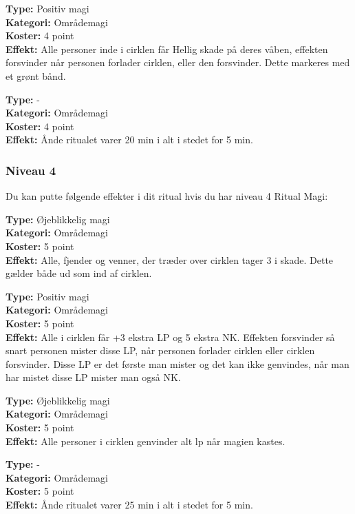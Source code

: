 \begin{ritual*}
\textbf{Type:} Positiv magi\\
\textbf{Kategori:} Områdemagi\\
\textbf{Koster:} 4 point\\
\textbf{Effekt:} Alle personer inde i cirklen får Hellig skade på deres våben, effekten forsvinder når personen forlader cirklen, eller den forsvinder. Dette markeres med et grønt bånd.
\end{ritual*}

\begin{ritual*}
\textbf{Type:} -\\
\textbf{Kategori:} Områdemagi\\
\textbf{Koster:} 4 point\\
\textbf{Effekt:} Ånde ritualet varer 20 min i alt i stedet for 5 min.
\end{ritual*}

\subsubsection*{Niveau 4}
Du kan putte følgende effekter i dit ritual hvis du har niveau 4 Ritual Magi:

\begin{ritual*}
\textbf{Type:} Øjeblikkelig magi\\
\textbf{Kategori:} Områdemagi\\
\textbf{Koster:} 5 point\\
\textbf{Effekt:} Alle, fjender og venner, der træder over cirklen tager 3 i skade. Dette gælder både ud som ind af cirklen.
\end{ritual*}

\begin{ritual*}
\textbf{Type:} Positiv magi\\
\textbf{Kategori:} Områdemagi\\
\textbf{Koster:} 5 point\\
\textbf{Effekt:} Alle i cirklen får +3 ekstra LP og 5 ekstra NK. 
Effekten forsvinder så snart personen mister disse LP, når personen forlader cirklen eller cirklen forsvinder. Disse LP er det første man mister og det kan ikke genvindes, når man har mistet disse LP mister man også NK.
\end{ritual*}

\begin{ritual*}[Helbredelse 3]
\textbf{Type:} Øjeblikkelig magi\\
\textbf{Kategori:} Områdemagi\\
\textbf{Koster:} 5 point\\
\textbf{Effekt:} Alle personer i cirklen genvinder alt lp når magien kastes.
\end{ritual*}

\begin{ritual*}
\textbf{Type:} -\\
\textbf{Kategori:} Områdemagi\\
\textbf{Koster:} 5 point\\
\textbf{Effekt:} Ånde ritualet varer 25 min i alt i stedet for 5 min.
\end{ritual*}